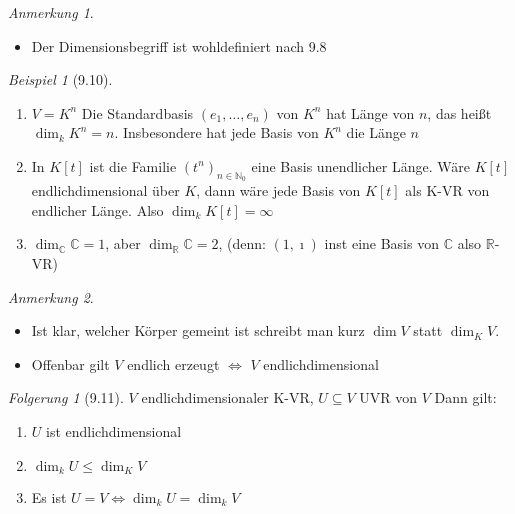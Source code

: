 \documentclass[a4paper]{scrartcl}
\theoremstyle{definition}
\theoremstyle{plain}
\theoremstyle{plain}
\theoremstyle{remark}
\theoremstyle{remark}
\newtheorem{note}{Anmerkung}
\theoremstyle{remark}
\newtheorem{conc}{Folgerung}
\theoremstyle{remark}
\theoremstyle{remark}
\newtheorem{ex}{Beispiel}
\newcommand{\I}{\ensuremath{\imath}}%
\begin{document}
\begin{note}
\begin{itemize}
\item Der Dimensionsbegriff ist wohldefiniert nach 9.8
\end{itemize}
\end{note}
\begin{ex}[9.10]
\begin{enumerate}
\item $V = K^n$ Die Standardbasis $(e_1, \ldots, e_n)$ von $K^n$ hat Länge von $n$, das heißt $\dim_k K^n = n$. Insbesondere hat jede Basis von $K^n$ die Länge $n$
\item In $K[t]$ ist die Familie $(t^n)_{n\in\mathbb{N}_0}$ eine Basis unendlicher Länge. Wäre $K[t]$ endlichdimensional über $K$, dann wäre jede Basis von $K[t]$ als K-VR von endlicher Länge. Also $\dim_k K[t] = \infty$
\item $\dim_\mathbb{C} \mathbb{C} = 1$, aber $\dim_\mathbb{R} \mathbb{C} = 2$, (denn: $(1,\I)$ inst eine Basis von $\mathbb{C}$ also $\mathbb{R}$-VR)
\end{enumerate}
\end{ex}
\begin{note}
\begin{itemize}
\item Ist klar, welcher Körper gemeint ist schreibt man kurz $\dim V$ statt $\dim_K V$.
\item Offenbar gilt $V$ endlich erzeugt $\iff$ $V$ endlichdimensional
\end{itemize}
\end{note}
\begin{conc}[9.11]
$V$ endlichdimensionaler K-VR, $U\subseteq V$ UVR von $V$ Dann gilt:
\begin{enumerate}
\item $U$ ist endlichdimensional
\item $\dim_k U \leq \dim_K V$
\item Es ist $U = V \iff \dim_k U = \dim_k V$
\end{enumerate}
\end{conc}
\end{document}
